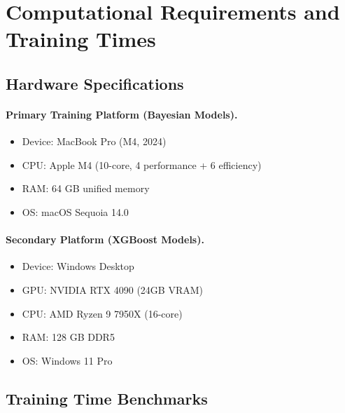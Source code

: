 \section{Computational Requirements and Training Times}
\label{sec:computational-requirements}

\subsection{Hardware Specifications}

\paragraph{Primary Training Platform (Bayesian Models).}
\begin{itemize}[itemsep=1pt,parsep=0pt]
    \item Device: MacBook Pro (M4, 2024)
    \item CPU: Apple M4 (10-core, 4 performance + 6 efficiency)
    \item RAM: 64 GB unified memory
    \item OS: macOS Sequoia 14.0
\end{itemize}

\paragraph{Secondary Platform (XGBoost Models).}
\begin{itemize}[itemsep=1pt,parsep=0pt]
    \item Device: Windows Desktop
    \item GPU: NVIDIA RTX 4090 (24GB VRAM)
    \item CPU: AMD Ryzen 9 7950X (16-core)
    \item RAM: 128 GB DDR5
    \item OS: Windows 11 Pro
\end{itemize}

\subsection{Training Time Benchmarks}

